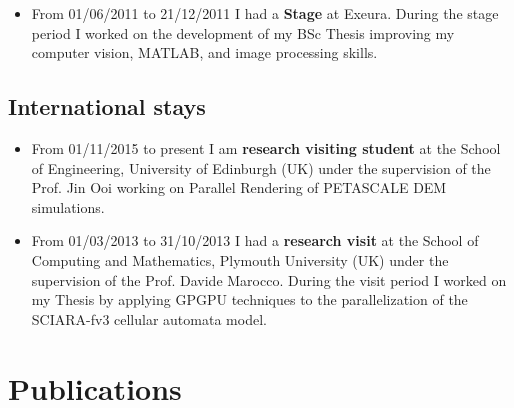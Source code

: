 \documentclass[a4paper,10pt]{article}
\begin{document}
\begin{itemize}
\item From 01/06/2011 to 21/12/2011 I had a \textbf{Stage} at Exeura.
During the stage period I worked on the development of my BSc Thesis
improving my computer vision, MATLAB, and image processing skills.
\end{itemize}

\subsection{International stays}


\begin{itemize}
 \item From 01/11/2015 to present I am \textbf{research visiting student} at the
School of Engineering, University of Edinburgh (UK) under the
supervision of the Prof. Jin Ooi working on Parallel Rendering of PETASCALE DEM
simulations.

\item From 01/03/2013 to 31/10/2013 I had a \textbf{research visit} at the
School of Computing and Mathematics, Plymouth University (UK) under the
supervision of the Prof. Davide Marocco.
During the visit period I worked on my  Thesis by applying GPGPU techniques to
the parallelization of the SCIARA-fv3 cellular automata model.
\end{itemize}


\begin{center}
\mbox{}
\end{center}

\section{Publications}
\end{document}
